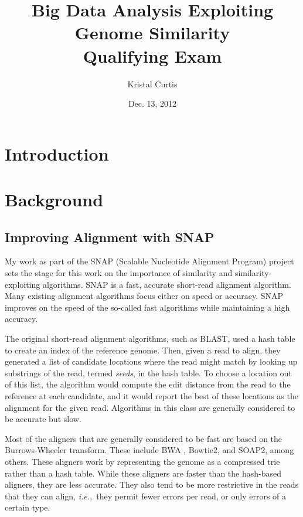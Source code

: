 \documentclass[twocolumn,10pt]{article}
\newcommand{\ie}{{\em i.e.,}~}
\begin{document}
\title{Big Data Analysis Exploiting Genome Similarity\\ Qualifying Exam}
\author{Kristal Curtis}
\date{Dec. 13, 2012}
\maketitle

\abstract

\section{Introduction} 

\section{Background}

\subsection{Improving Alignment with SNAP}
\label{section:SNAP}

My work as part of the SNAP (Scalable Nucleotide Alignment Program) project sets the stage for this work on the importance of similarity and similarity-exploiting algorithms.  SNAP is a fast, accurate short-read alignment algorithm.  Many existing alignment algorithms focus either on speed or accuracy.  SNAP improves on the speed of the so-called fast algorithms while maintaining a high accuracy.

The original short-read alignment algorithms, such as BLAST, used a hash table to create an index of the reference genome.  Then, given a read to align, they generated a list of candidate locations where the read might match by looking up substrings of the read, termed \textit{seeds}, in the hash table.  To choose a location out of this list, the algorithm would compute the edit distance from the read to the reference at each candidate, and it would report the best of these locations as the alignment for the given read.  Algorithms in this class are generally considered to be accurate but slow.

Most of the aligners that are generally considered to be fast are based on the Burrows-Wheeler transform.  These include BWA \cite{Li:2009}, Bowtie2, and SOAP2, among others.  These aligners work by representing the genome as a compressed trie rather than a hash table.  While these aligners are faster than the hash-based aligners, they are less accurate.  They also tend to be more restrictive in the reads that they can align, \ie they permit fewer errors per read, or only errors of a certain type.
\end{document}
